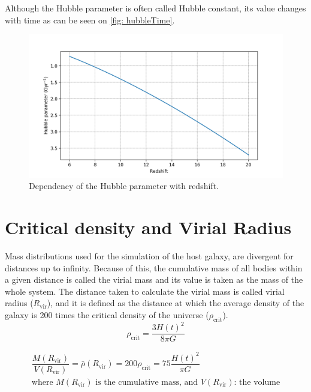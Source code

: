 	Although the Hubble parameter is often called Hubble constant, its value changes with time as can be seen on \autoref{fig: hubbleTime}. %
	\begin{figure}[h]
		\centering
		\includegraphics[width=0.8\linewidth]{"../Files/Week 5/hubble_time"}
		\caption{Dependency of the Hubble parameter with redshift.}
		\label{fig: hubbleTime}
	\end{figure}
	
	\section{Critical density and Virial Radius}\label{sec: cd_vr}
	Mass distributions used for the simulation of the host galaxy, are divergent for distances up to infinity. Because of this, the cumulative mass of all bodies within a given distance is called the virial mass and its value is taken as the mass of the whole system. The distance taken to calculate the virial mass is called virial radius ($R_\text{vir}$), and it is defined as the distance at which the average density of the galaxy is 200 times the critical density of the universe ($\rho_\text{crit}$).
	\begin{equation}\label{eq: critical_density}
	\rho_\text{crit} = \dfrac{3H(t)^2}{8\pi G}
	\end{equation}
	
	\begin{equation}\label{eq: R_vir_def}
	\begin{array}{c}
	\dfrac{M(R_\text{vir})}{V(R_\text{vir})} = \bar{\rho}(R_\text{vir}) =  200 \rho_\text{crit} = 75\dfrac{H(t)^2}{\pi G}\\
	\text{where $M(R_\text{vir})$ is the cumulative mass, and $V(R_\text{vir})$: the volume}
	\end{array}			
	\end{equation}
	
